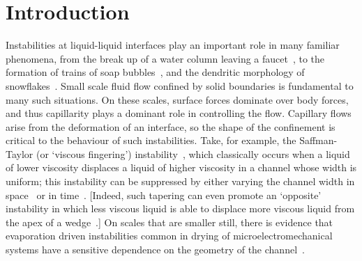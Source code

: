 \documentclass{jfm}
\begin{document}
\section{Introduction}\label{S:Introduction}
Instabilities at liquid-liquid interfaces play an important role in many familiar phenomena, from the break up of a water column leaving a faucet~\citep{Plateau1873, Rayleigh1879PRSL}, to the formation of trains of soap bubbles~\citep{Eggers2008RepProgPhys}, and the dendritic morphology of snowflakes~\citep{Langer1980RevModPhys}. %
Small scale fluid flow confined by solid boundaries is fundamental to many such situations.  On these scales, surface forces dominate over body forces, and thus capillarity plays a dominant role in controlling the flow. Capillary flows arise from the deformation of an interface, so the shape of the confinement is critical to the behaviour of such instabilities. Take, for example, the Saffman-Taylor (or `viscous fingering') instability~\citep{Saffman1958PRSL}, which classically occurs when a liquid of lower viscosity displaces a liquid of higher viscosity in a channel whose width is uniform; this instability can be suppressed by either varying the channel width in space~\citep{AlHousseiny2012NaturePhysics, AlHousseiny2013PhysFlu, Reyssat2014JFM} or in time~\citep{Zheng2015PRL}. [Indeed, such tapering can even promote an `opposite' instability in which less viscous liquid is able to displace more viscous liquid from the apex of a wedge~\citep{Keiser2016JFM}.] On scales that are smaller still, there is evidence that evaporation driven instabilities common in drying of microelectromechanical systems have a sensitive dependence on the geometry of the channel~\citep[for example]{Hadjittofis2016JFM, LedesmaAguilar2017SoftMatter, Ha2021SoftMatter}.
\end{document}
